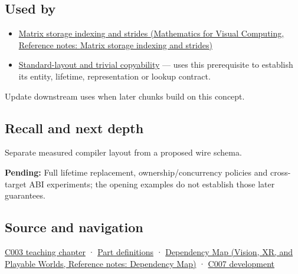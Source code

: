 \subsection{Used by}\label{appendix-c4ac6bb0fff8-used-by}

\hypertarget{appendix-c4ac6bb0fff8-used-by}{}

\begin{itemize}
\item
  \href{../02-Mathematics-for-Visual-Computing/main.pdf\#nameddest=appendix-ffdc1d4e5350}{Matrix storage indexing and strides (Mathematics for Visual Computing, Reference notes: Matrix storage indexing and strides)}
\item
  \hyperref[appendix-958870a64c53]{Standard-layout and trivial copyability} --- uses this prerequisite to establish its entity, lifetime, representation or lookup contract.
\end{itemize}

Update downstream uses when later chunks build on this concept.

\subsection{Recall and next depth}\label{appendix-c4ac6bb0fff8-recall-and-next-depth}

\hypertarget{appendix-c4ac6bb0fff8-recall-and-next-depth}{}

Separate measured compiler layout from a proposed wire schema.

\textbf{Pending:} Full lifetime replacement, ownership/concurrency policies and cross-target ABI experiments; the opening examples do not establish those later guarantees.

\subsection{Source and navigation}\label{appendix-c4ac6bb0fff8-source-and-navigation}

\hypertarget{appendix-c4ac6bb0fff8-source-and-navigation}{}

\hyperref[01-foundations-i-ch002-where-the-bytes-live]{C003 teaching chapter} · \hyperref[appendix-fd090d982a15-m003---parts-41-60]{Part definitions} · \href{../07-Vision-XR-and-Playable-Worlds/main.pdf\#nameddest=appendix-4ad47bdd269a}{Dependency Map (Vision, XR, and Playable Worlds, Reference notes: Dependency Map)} · \hyperref[01-foundations-i-ch003-bringing-the-object-model-back-to-bytes]{C007 development}
